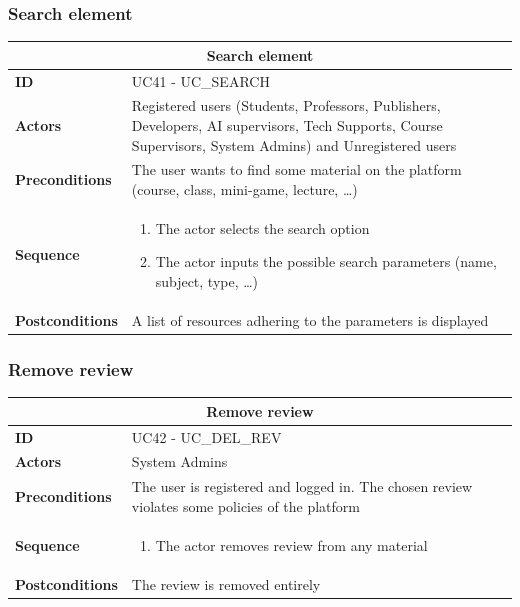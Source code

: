 \subsubsection{Search element}
\begin{tabular}{|m{2.5cm}|m{8cm}|}
	\hline
	\multicolumn{2}{|c|}{Search element} \\
	\hline
	\textbf{ID} & UC41 - UC\_SEARCH \\
	\hline
	\textbf{Actors} & Registered users (Students, Professors, Publishers, Developers, AI supervisors, Tech Supports, Course Supervisors, System Admins) and Unregistered users \\
	\hline
	\textbf{Preconditions} & The user wants to find some material on the platform (course, class, mini-game, lecture, …) \\
	\hline
	\textbf{Sequence} & 
	\begin{enumerate}
		\item The actor selects the search option
		\item The actor inputs the possible search parameters (name, subject, type, …)
	\end{enumerate} \\
	\hline
	\textbf{Postconditions} & A list of resources adhering to the parameters is displayed \\
	\hline
\end{tabular}

\subsubsection{Remove review}
\begin{tabular}{|m{2.5cm}|m{8cm}|}
	\hline
	\multicolumn{2}{|c|}{Remove review} \\
	\hline
	\textbf{ID} & UC42 - UC\_DEL\_REV \\
	\hline
	\textbf{Actors} & System Admins \\
	\hline
	\textbf{Preconditions} & The user is registered and logged in. The chosen review violates some policies of the platform \\
	\hline
	\textbf{Sequence} & 
	\begin{enumerate}
		\item The actor removes review from any material
	\end{enumerate} \\
	\hline
	\textbf{Postconditions} & The review is removed entirely \\
	\hline
\end{tabular}

